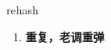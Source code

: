 
\begin{frame}
{\huge rehash}
\begin{center}
\begin{enumerate}\Large
  \item \textbf{重复，老调重弹}
\end{enumerate}
\end{center}
\end{frame}
